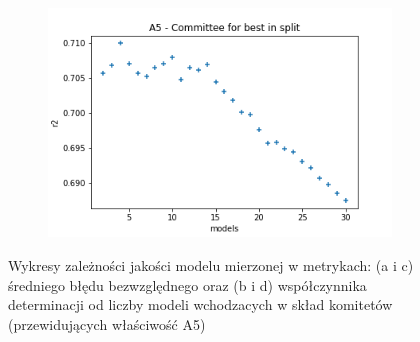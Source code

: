 \begin{figure}
\begin{subfigure}[b]{0.49\textwidth}
         \caption{}
         \label{fig:ea-split-mae-a5}
     \end{subfigure}
     \begin{subfigure}[b]{0.49\textwidth}
         \centering
         \includegraphics[width=\textwidth]{images/A5_split_r2.png}
         \caption{}
         \label{fig:ea-split-r2-a5}
     \end{subfigure}
        \caption{Wykresy zależności jakości modelu mierzonej w metrykach: (a i c) średniego błędu bezwzględnego oraz (b i d) współczynnika determinacji od liczby modeli wchodzacych w skład komitetów (przewidujących właściwość A5)}
        \label{fig:a5-committee}
\end{figure}

